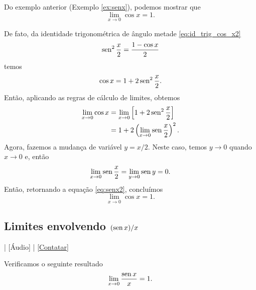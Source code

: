 \begin{obs}
  Do exemplo anterior (Exemplo \ref{ex:senx}), podemos mostrar que
\begin{equation}
  \lim_{x\to 0} \cos x = 1.
\end{equation}

De fato, da identidade trigonométrica de ângulo metade \eqref{eq:id_trig_cos_x2}
\begin{equation}
  \operatorname{sen}^2 \frac{x}{2} = \frac{1 - \cos x}{2}
\end{equation}
temos
\begin{equation}
  \cos x = 1 + 2\operatorname{sen}^2 \frac{x}{2}.
\end{equation}
Então, aplicando as regras de cálculo de limites, obtemos
\begin{align}
  \lim_{x\to 0} \cos x &= \lim_{x\to 0} \left[1 + 2\operatorname{sen}^2 \frac{x}{2}\right] \\
                       &= 1 + 2\left(\lim_{x\to 0} \operatorname{sen} \frac{x}{2}\right)^2.\label{eq:senx2}
\end{align}
Agora, fazemos a mudança de variável $y = x/2$. Neste caso, temos $y\to 0$ quando $x\to 0$ e, então
\begin{equation}
  \lim_{x\to 0} \operatorname{sen} \frac{x}{2} = \lim_{y\to 0} \operatorname{sen} y = 0.
\end{equation}
Então, retornando a equação \eqref{eq:senx2}, concluímos
\begin{equation}
  \lim_{x\to 0} \cos x = 1.
\end{equation}
\end{obs}

\subsection{Limites envolvendo $(\operatorname{sen} x)/x$}\label{sec:lim_senx_x}

\begin{flushright}
  [Vídeo] | [Áudio] | \href{https://phkonzen.github.io/notas/contato.html}{[Contatar]}
\end{flushright}

Verificamos o seguinte resultado
\begin{equation}\label{eq:lim_senx_x}
  \lim_{x\to 0} \frac{\operatorname{sen} x}{x} = 1.
\end{equation}


